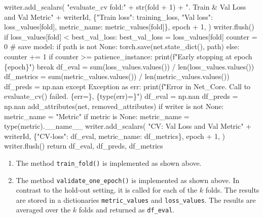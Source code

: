 \documentclass[
  letterpaper,
  DIV=11,
  numbers=noendperiod]{scrreprt}
\newenvironment{Shaded}{\begin{snugshade}}{\end{snugshade}}
\newcommand{\NormalTok}[1]{\textcolor[rgb]{0.00,0.23,0.31}{#1}}
\begin{document}
\begin{Shaded}
\begin{Highlighting}[]
\NormalTok{                    writer.add\_scalars(}
\NormalTok{                        "evaluate\_cv fold:" + str(fold + 1) + }
\NormalTok{                        ". Train \& Val Loss and Val Metric" + writerId,}
\NormalTok{                        \{"Train loss": training\_loss, "Val loss": }
\NormalTok{                        loss\_values[fold], metric\_name: metric\_values[fold]\},}
\NormalTok{                        epoch + 1,}
\NormalTok{                    )}
\NormalTok{                    writer.flush()}
\NormalTok{                if loss\_values[fold] \textless{} best\_val\_loss:}
\NormalTok{                    best\_val\_loss = loss\_values[fold]}
\NormalTok{                    counter = 0}
\NormalTok{                    \# save model:}
\NormalTok{                    if path is not None:}
\NormalTok{                        torch.save(net.state\_dict(), path)}
\NormalTok{                else:}
\NormalTok{                    counter += 1}
\NormalTok{                    if counter \textgreater{}= patience\_instance:}
\NormalTok{                        print(f"Early stopping at epoch \{epoch\}")}
\NormalTok{                        break}
\NormalTok{        df\_eval = sum(loss\_values.values()) / len(loss\_values.values())}
\NormalTok{        df\_metrics = sum(metric\_values.values()) / len(metric\_values.values())}
\NormalTok{        df\_preds = np.nan}
\NormalTok{    except Exception as err:}
\NormalTok{        print(f"Error in Net\_Core. Call to evaluate\_cv() failed. \{err=\}, }
\NormalTok{            \{type(err)=\}")}
\NormalTok{        df\_eval = np.nan}
\NormalTok{        df\_preds = np.nan}
\NormalTok{    add\_attributes(net, removed\_attributes)}
\NormalTok{    if writer is not None:}
\NormalTok{        metric\_name = "Metric"}
\NormalTok{        if metric is None:}
\NormalTok{            metric\_name = type(metric).\_\_name\_\_}
\NormalTok{        writer.add\_scalars(}
\NormalTok{            "CV: Val Loss and Val Metric" + writerId,}
\NormalTok{            \{"CV{-}loss": df\_eval, metric\_name: df\_metrics\},}
\NormalTok{            epoch + 1,}
\NormalTok{        )}
\NormalTok{        writer.flush()}
\NormalTok{    return df\_eval, df\_preds, df\_metrics}
\end{Highlighting}
\end{Shaded}

\begin{enumerate}
\def\labelenumi{\arabic{enumi}.}
\setcounter{enumi}{3}
\item
  The method \texttt{train\_fold()} is implemented as shown above.
\item
  The method \texttt{validate\_one\_epoch()} is implemented as shown
  above. In contrast to the hold-out setting, it is called for each of
  the \(k\) folds. The results are stored in a dictionaries
  \texttt{metric\_values} and \texttt{loss\_values}. The results are
  averaged over the \(k\) folds and returned as \texttt{df\_eval}.
\end{enumerate}
\end{document}
